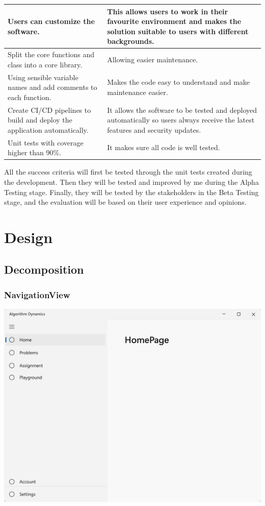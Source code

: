 \documentclass[a4paper]{report}
\begin{document}
\begin{tabulary}{\linewidth}{|L|L|}
    \hline
    Users can customize the software. & This allows users to work in their favourite environment and makes the solution suitable to users with different backgrounds.\\
    \hline
    Split the core functions and class into a core library. & Allowing easier maintenance. \\
    \hline
    Using sensible variable names and add comments to each function. & Makes the code easy to understand and make maintenance easier.\\
    \hline
    Create CI/CD pipelines to build and deploy the application automatically. & It allows the software to be tested and deployed automatically so users always receive the latest features and security updates.\\
    \hline
    Unit tests with coverage higher than 90\%. & It makes sure all code is well tested. \\
    \hline
\end{tabulary}

All the success criteria will first be tested through the unit tests created during the development. Then they will be tested and improved by me during the Alpha Testing stage. Finally, they will be tested by the stakeholders in the Beta Testing stage, and the evaluation will be based on their user experience and opinions.

\chapter{Design}
\section{Decomposition}



\subsection{NavigationView}

\includegraphics[width=\textwidth, height=\textheight, keepaspectratio]{NavigationView-design}
\end{document}
